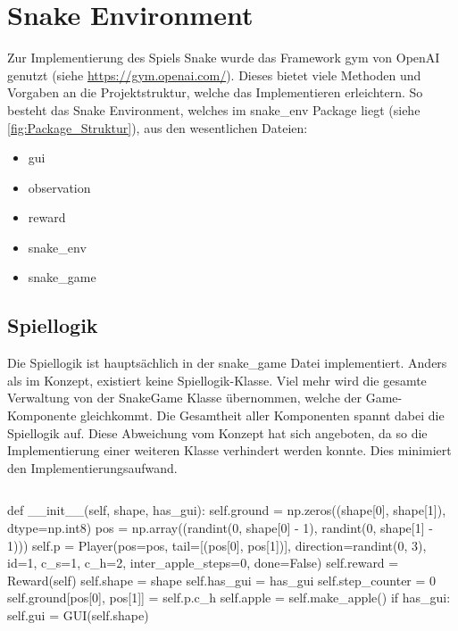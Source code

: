 \section{Snake Environment}
Zur Implementierung des Spiels Snake wurde das Framework gym von OpenAI genutzt (siehe \url{https://gym.openai.com/}). Dieses bietet viele Methoden und Vorgaben an die Projektstruktur, welche das Implementieren erleichtern. So besteht das Snake Environment, welches im snake\_env Package liegt (siehe \ref{fig:Package_Struktur}), aus den wesentlichen Dateien:
\begin{itemize}
	\item gui
	\item observation
	\item reward
	\item snake\_env
	\item snake\_game
\end{itemize}

\subsection{Spiellogik} \label{sec:Implementierung-Spiellogik}
Die Spiellogik ist hauptsächlich in der snake\_game Datei implementiert. Anders als im Konzept, existiert keine Spiellogik-Klasse. Viel mehr wird die gesamte Verwaltung von der SnakeGame Klasse übernommen, welche der Game-Komponente gleichkommt. Die Gesamtheit aller Komponenten spannt dabei die Spiellogik auf. Diese Abweichung vom Konzept hat sich angeboten, da so die Implementierung einer weiteren Klasse verhindert werden konnte. Dies minimiert den Implementierungsaufwand.

\begin{lstlisting}[label=alg:SnakeGame_Konstruktor]
\end{lstlisting}
\begin{python} 
	def __init__(self, shape, has_gui):
		self.ground = np.zeros((shape[0], shape[1]), dtype=np.int8)
		pos = np.array((randint(0, shape[0] - 1),
			    randint(0, shape[1] - 1)))
		self.p = Player(pos=pos, tail=[(pos[0], pos[1])], 
				     direction=randint(0, 3), id=1, c_s=1, c_h=2,
					   inter_apple_steps=0, done=False)
		self.reward = Reward(self)
		self.shape = shape
		self.has_gui = has_gui
		self.step_counter = 0
		self.ground[pos[0], pos[1]] = self.p.c_h
		self.apple = self.make_apple()
		if has_gui:
			self.gui = GUI(self.shape)
\end{python}

